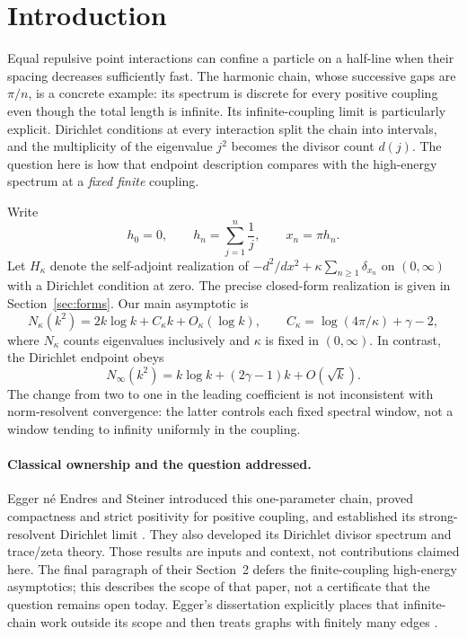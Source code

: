 \section{Introduction}
\label{sec:introduction}

Equal repulsive point interactions can confine a particle on a
half-line when their spacing decreases sufficiently fast.
The harmonic chain, whose successive gaps are $\pi/n$, is a concrete
example: its spectrum is discrete for every positive coupling even
though the total length is infinite.
Its infinite-coupling limit is particularly explicit.
Dirichlet conditions at every interaction split the chain into
intervals, and the multiplicity of the eigenvalue $j^2$ becomes the
divisor count $d(j)$.
The question here is how that endpoint description compares with the
high-energy spectrum at a \emph{fixed finite} coupling.

Write
\[
h_0=0,\qquad h_n=\sum_{j=1}^n\frac1j,\qquad x_n=\pi h_n.
\]
Let $H_\kappa$ denote the self-adjoint realization of
$-d^2/dx^2+\kappa\sum_{n\ge1}\delta_{x_n}$ on $(0,\infty)$ with a
Dirichlet condition at zero.
The precise closed-form realization is given in
Section~\ref{sec:forms}.
Our main asymptotic is
\begin{equation}
N_\kappa(k^2)
=2k\log k+C_\kappa k+O_\kappa(\log k),
\qquad
C_\kappa=\log(4\pi/\kappa)+\gamma-2,
\label{eq:intro-count}
\end{equation}
where $N_\kappa$ counts eigenvalues inclusively and $\kappa$ is fixed
in $(0,\infty)$.
In contrast, the Dirichlet endpoint obeys
\begin{equation}
N_\infty(k^2)
=k\log k+(2\gamma-1)k+O(\sqrt{k}).
\label{eq:intro-endpoint}
\end{equation}
The change from two to one in the leading coefficient is not
inconsistent with norm-resolvent convergence: the latter controls
each fixed spectral window, not a window tending to infinity
uniformly in the coupling.

\paragraph{Classical ownership and the question addressed.}
Egger n\'e Endres and Steiner introduced this one-parameter chain,
proved compactness and strict positivity for positive coupling, and
established its strong-resolvent Dirichlet limit
\citep[Section 2]{egger2011infinite}.
They also developed its Dirichlet divisor spectrum and trace/zeta
theory.
Those results are inputs and context, not contributions claimed here.
The final paragraph of their Section~2 defers the finite-coupling
high-energy asymptotics; this describes the scope of that paper,
not a certificate that the question remains open today.
Egger's dissertation explicitly places that infinite-chain work
outside its scope and then treats graphs with finitely many edges
\citep[Introduction and Chapter 2]{egger2011thesis}.

